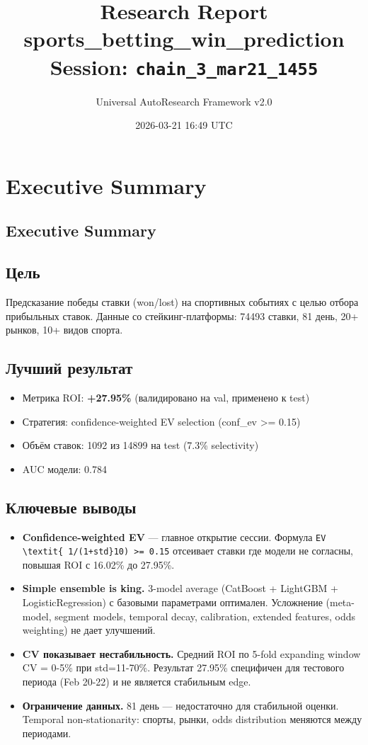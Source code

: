 \documentclass[12pt,a4paper]{article}
\title{
    \Large\textbf{Research Report}\\[0.5em]
    \large sports\_betting\_win\_prediction\\[0.3em]
    \normalsize Session: \texttt{chain\_3\_mar21\_1455}
}
\author{Universal AutoResearch Framework v2.0}
\date{2026-03-21 16:49 UTC}
\begin{document}
\maketitle
\tableofcontents
\newpage


\section{Executive Summary}

\subsection{Executive Summary}

\subsection{Цель}
Предсказание победы ставки (won/lost) на спортивных событиях с целью отбора прибыльных ставок. Данные со стейкинг-платформы: 74493 ставки, 81 день, 20+ рынков, 10+ видов спорта.

\subsection{Лучший результат}
\begin{itemize}
  \item Метрика ROI: \textbf{+27.95\%} (валидировано на val, применено к test)
  \item Стратегия: confidence-weighted EV selection (conf\_ev >= 0.15)
  \item Объём ставок: 1092 из 14899 на test (7.3\% selectivity)
  \item AUC модели: 0.784
\end{itemize}

\subsection{Ключевые выводы}
\begin{itemize}
  \item \textbf{Confidence-weighted EV} — главное открытие сессии. Формула \texttt{EV \textbackslash{}textit\{ 1/(1+std\}10) >= 0.15} отсеивает ставки где модели не согласны, повышая ROI с 16.02\% до 27.95\%.
  \item \textbf{Simple ensemble is king.} 3-model average (CatBoost + LightGBM + LogisticRegression) с базовыми параметрами оптимален. Усложнение (meta-model, segment models, temporal decay, calibration, extended features, odds weighting) не дает улучшений.
  \item \textbf{CV показывает нестабильность.} Средний ROI по 5-fold expanding window CV = 0-5\% при std=11-70\%. Результат 27.95\% специфичен для тестового периода (Feb 20-22) и не является стабильным edge.
  \item \textbf{Ограничение данных.} 81 день — недостаточно для стабильной оценки. Temporal non-stationarity: спорты, рынки, odds distribution меняются между периодами.
\end{itemize}
\end{document}
